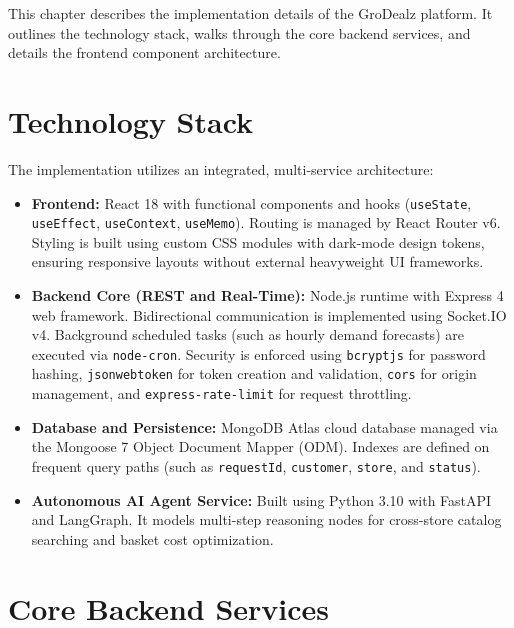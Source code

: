 
This chapter describes the implementation details of the GroDealz platform. It outlines the technology stack, walks through the core backend services, and details the frontend component architecture.

\section{Technology Stack}

The implementation utilizes an integrated, multi-service architecture:

\begin{itemize}
    \item \textbf{Frontend:} React 18 with functional components and hooks (\texttt{useState}, \texttt{useEffect}, \texttt{useContext}, \texttt{useMemo}). Routing is managed by React Router v6. Styling is built using custom CSS modules with dark-mode design tokens, ensuring responsive layouts without external heavyweight UI frameworks.
    \item \textbf{Backend Core (REST and Real-Time):} Node.js runtime with Express 4 web framework. Bidirectional communication is implemented using Socket.IO v4. Background scheduled tasks (such as hourly demand forecasts) are executed via \texttt{node-cron}. Security is enforced using \texttt{bcryptjs} for password hashing, \texttt{jsonwebtoken} for token creation and validation, \texttt{cors} for origin management, and \texttt{express-rate-limit} for request throttling.
    \item \textbf{Database and Persistence:} MongoDB Atlas cloud database managed via the Mongoose 7 Object Document Mapper (ODM). Indexes are defined on frequent query paths (such as \texttt{requestId}, \texttt{customer}, \texttt{store}, and \texttt{status}).
    \item \textbf{Autonomous AI Agent Service:} Built using Python 3.10 with FastAPI and LangGraph. It models multi-step reasoning nodes for cross-store catalog searching and basket cost optimization.
\end{itemize}

\section{Core Backend Services}

